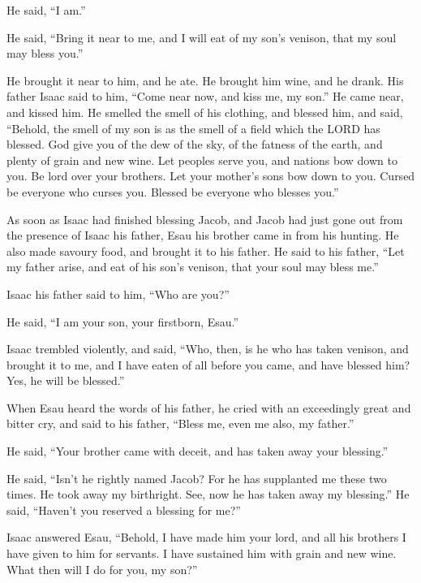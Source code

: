 He said, ``I am.''

 He said, ``Bring it near to me, and I will eat of my
son's venison, that my soul may bless you.''

He brought it near to him, and he ate. He brought him wine, and he
drank.  His father Isaac said to him, ``Come near now,
and kiss me, my son.''  He came near, and kissed him. He
smelled the smell of his clothing, and blessed him, and said, ``Behold,
the smell of my son is as the smell of a field which the LORD has
blessed.  God give you of the dew of the sky, of the
fatness of the earth, and plenty of grain and new wine. 
Let peoples serve you, and nations bow down to you. Be lord over your
brothers. Let your mother's sons bow down to you. Cursed be everyone who
curses you. Blessed be everyone who blesses you.''

 As soon as Isaac had finished blessing Jacob, and Jacob
had just gone out from the presence of Isaac his father, Esau his
brother came in from his hunting.  He also made savoury
food, and brought it to his father. He said to his father, ``Let my
father arise, and eat of his son's venison, that your soul may bless
me.''

 Isaac his father said to him, ``Who are you?''

He said, ``I am your son, your firstborn, Esau.''

 Isaac trembled violently, and said, ``Who, then, is he
who has taken venison, and brought it to me, and I have eaten of all
before you came, and have blessed him? Yes, he will be blessed.''

 When Esau heard the words of his father, he cried with
an exceedingly great and bitter cry, and said to his father, ``Bless me,
even me also, my father.''

 He said, ``Your brother came with deceit, and has taken
away your blessing.''

 He said, ``Isn't he rightly named Jacob? For he has
supplanted me these two times. He took away my birthright. See, now he
has taken away my blessing.'' He said, ``Haven't you reserved a blessing
for me?''

 Isaac answered Esau, ``Behold, I have made him your
lord, and all his brothers I have given to him for servants. I have
sustained him with grain and new wine. What then will I do for you, my
son?''

